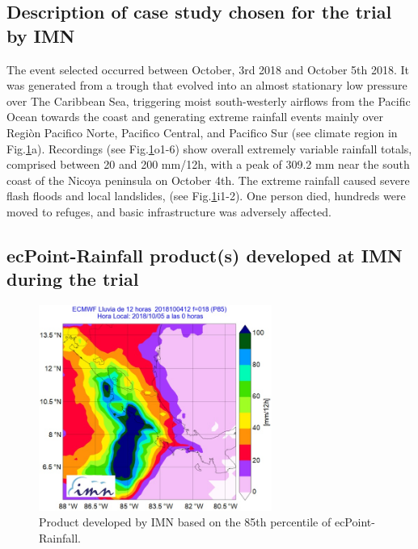 \documentclass[twocol]{ametsocV5} %
\begin{document}
\subsection{Description of case study chosen for the trial by IMN}
The event selected occurred between October, 3rd 2018 and October 5th 2018. It was generated from a trough that evolved into an almost stationary low pressure over The Caribbean Sea, triggering moist south-westerly airflows from the Pacific Ocean towards the coast and generating extreme rainfall events mainly over Regiòn Pacifico Norte, Pacifico Central, and Pacifico Sur (see climate region in Fig.\ref{Fig3}a). Recordings (see Fig.\ref{Fig3}o1-6) show overall extremely variable rainfall totals, comprised between 20 and 200 mm/12h, with a peak of 309.2 mm near the south coast of the Nicoya peninsula on October 4th. The extreme rainfall caused severe flash floods and local landslides, (see Fig.\ref{Fig3}i1-2). One person died, hundreds were moved to refuges, and basic infrastructure was adversely affected.


\subsection{ecPoint-Rainfall product(s) developed at IMN during the trial}

\begin{figure}
\centerline{\includegraphics[width=18pc]{manuscript/Figures/Fig3.jpg}}
\caption{Product developed by IMN based on the 85th percentile of ecPoint-Rainfall.}
\label{Fig3}
\end{figure}
\end{document}
